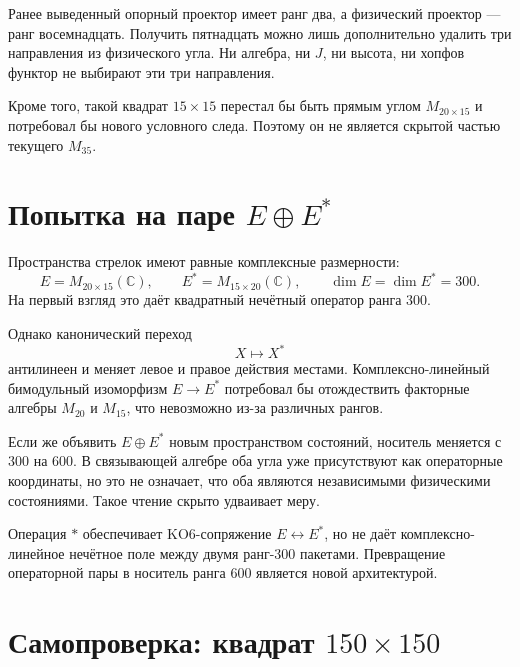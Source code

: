 Ранее выведенный опорный проектор имеет ранг два, а физический проектор ---
ранг восемнадцать. Получить пятнадцать можно лишь дополнительно удалить
три направления из физического угла. Ни алгебра, ни $J$, ни высота, ни
хопфов функтор не выбирают эти три направления.

Кроме того, такой квадрат $15\times15$ перестал бы быть прямым углом
$M_{20\times15}$ и потребовал бы нового условного следа. Поэтому он не
является скрытой частью текущего $M_{35}$.

\section{Попытка на паре
\texorpdfstring{$E\oplus E^*$}{E и E*}}

Пространства стрелок имеют равные комплексные размерности:
\begin{equation}
 E=M_{20\times15}(\mathbb C),
 \qquad
 E^*=M_{15\times20}(\mathbb C),
 \qquad
 \dim E=\dim E^*=300.
\end{equation}
На первый взгляд это даёт квадратный нечётный оператор ранга $300$.

Однако канонический переход
\begin{equation}
 X\longmapsto X^*
\end{equation}
антилинеен и меняет левое и правое действия местами. Комплексно-линейный
бимодульный изоморфизм $E\to E^*$ потребовал бы отождествить факторные
алгебры $M_{20}$ и $M_{15}$, что невозможно из-за различных рангов.

Если же объявить $E\oplus E^*$ новым пространством состояний, носитель
меняется с $300$ на $600$. В связывающей алгебре оба угла уже присутствуют
как операторные координаты, но это не означает, что оба являются
независимыми физическими состояниями. Такое чтение скрыто удваивает меру.

\begin{nogocriterion}
Операция $*$ обеспечивает KO6-сопряжение $E\leftrightarrow E^*$, но не
даёт комплексно-линейное нечётное поле между двумя ранг-300 пакетами.
Превращение операторной пары в носитель ранга 600 является новой
архитектурой.
\end{nogocriterion}

\section{Самопроверка: квадрат
\texorpdfstring{$150\times150$}{150 x 150}}

